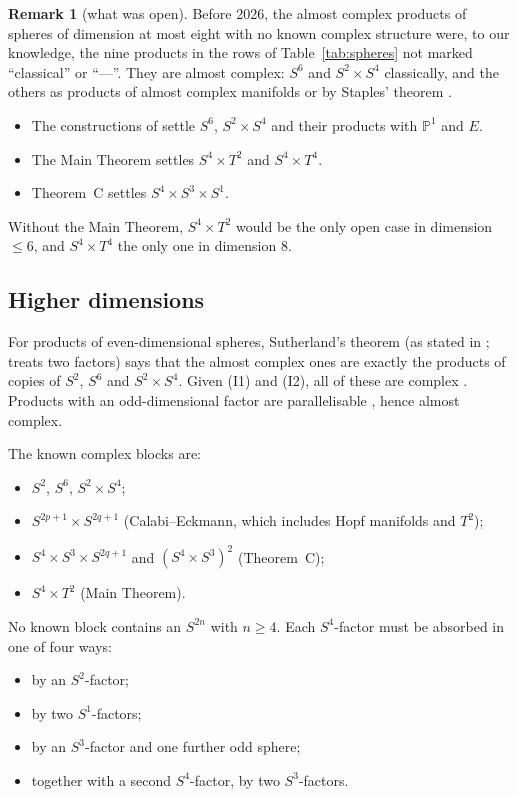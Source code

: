 \documentclass{article}
\theoremstyle{definition}
\newtheorem{remark}[theorem]{Remark}
\theoremstyle{plain}
\newcommand{\PP}{\mathbb{P}}
\begin{document}
\begin{remark}[what was open]\label{rem:wasopen}
Before 2026, the almost complex products of spheres of dimension at most eight with no
known complex structure were, to our knowledge, the nine products in the rows of
Table~\ref{tab:spheres} not marked ``classical'' or ``---''. They are almost complex: $S^6$ and $S^2\times S^4$
classically, and the others as products of almost complex manifolds or by Staples'
theorem \cite{Staples67}.
\begin{itemize}
\item The constructions of \cite{AC26,Engel26,GFL26,LLZ26} settle $S^6$,
  $S^2\times S^4$ and their products with $\PP^1$ and $E$.
\item The Main Theorem settles $S^4\times T^2$ and $S^4\times T^4$.
\item Theorem~C settles $S^4\times S^3\times S^1$.
\end{itemize}
Without the Main Theorem, $S^4\times T^2$ would be the only open case in dimension $\le6$,
and $S^4\times T^4$ the only one in dimension $8$.
\end{remark}

\subsection{Higher dimensions}\label{sec:higherdim}
For products of even-dimensional spheres, Sutherland's theorem
\cite[Thm.~3.1]{Sutherland65} (as stated in \cite{LLZ26}; \cite{DattaSubramanian90} treats
two factors) says that the almost complex ones are exactly the products of copies of
$S^2$, $S^6$ and $S^2\times S^4$. Given (I1) and (I2), all of these are complex
\cite[Cor.~1.3]{LLZ26}. Products with an odd-dimensional factor are parallelisable
\cite{Staples67}, hence almost complex.

The known complex blocks are:
\begin{itemize}
\item $S^2$, $S^6$, $S^2\times S^4$;
\item $S^{2p+1}\times S^{2q+1}$ (Calabi--Eckmann, which includes Hopf manifolds and $T^2$);
\item $S^4\times S^3\times S^{2q+1}$ and $(S^4\times S^3)^2$ (Theorem~C);
\item $S^4\times T^2$ (Main Theorem).
\end{itemize}
No known block contains an $S^{2n}$ with $n\ge4$. Each $S^4$-factor must be absorbed in one
of four ways:
\begin{itemize}
\item by an $S^2$-factor;
\item by two $S^1$-factors;
\item by an $S^3$-factor and one further odd sphere;
\item together with a second $S^4$-factor, by two $S^3$-factors.
\end{itemize}
\end{document}
